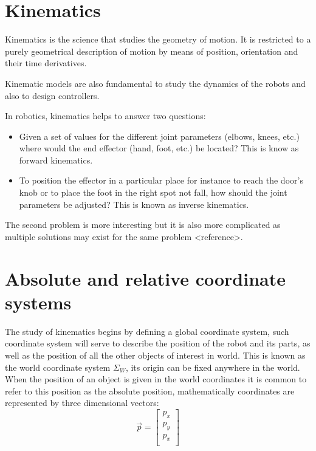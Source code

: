 \documentclass[a4paper]{report}
\begin{document}
\section{Kinematics}
Kinematics is the science that studies the geometry of motion. It is restricted to a purely geometrical description of motion by means of position, orientation and their time derivatives.

Kinematic models are also fundamental to study the dynamics of the robots and also to design controllers.

In robotics, kinematics helps to answer two questions:
\begin{itemize}
    \item{} Given a set of values for the different joint parameters (elbows, knees, etc.) where would the end effector (hand, foot, etc.) be located? This is know as forward kinematics.
    \item{} To position the effector in a particular place for instance to reach the door's knob or to place the foot in the right spot not fall, how should the joint parameters be adjusted? This is known as inverse kinematics.
\end{itemize}

The second problem is more interesting but it is also more complicated as multiple solutions may exist for the same problem <reference>.

\section{Absolute and relative coordinate systems}
The study of kinematics begins by defining a global coordinate system, such coordinate system will serve to describe the position of the robot and its parts, as well as the position of all the other objects of interest in world. This is known as the world coordinate system $\Sigma_W$, its origin can be fixed anywhere in the world. When the position of an object is given in the world coordinates it is common to refer to this position as the absolute position, mathematically coordinates are represented by three dimensional vectors:
\begin{equation}
    \vec{p} = \begin{bmatrix}
        p_x\\
        p_y\\
        p_x\\
    \end{bmatrix}
\end{equation}
\end{document}
